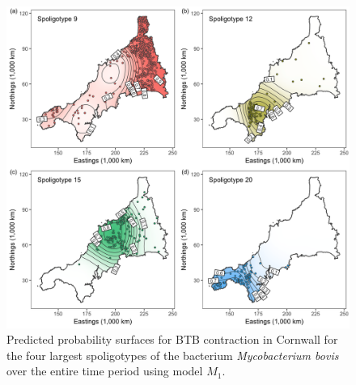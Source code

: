 \documentclass[a4paper,showframe,11pt]{report}\usepackage[]{graphicx}\usepackage[]{color}
\newenvironment{knitrout}{}{} %
\begin{document}
\begin{knitrout}
\color{fgcolor}\begin{figure}[p]

{\centering \includegraphics[width=\linewidth]{figure/05-plot_btb-1} 

}

\caption[Predicted probability surfaces for BTB contraction in Cornwall for the four largest spoligotypes of the bacterium \emph{Mycobacterium bovis} over the entire time period using model $M_1$]{Predicted probability surfaces for BTB contraction in Cornwall for the four largest spoligotypes of the bacterium \emph{Mycobacterium bovis} over the entire time period using model $M_1$.}\label{fig:plot.btb}
\end{figure}


\end{knitrout}
\end{document}
